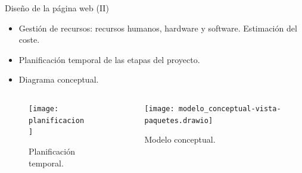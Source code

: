\begin{frame}{Diseño de la página web (II)}

    \begin{itemize}
        \item Gestión de recursos: recursos humanos, hardware y software. Estimación del coste.
        \item Planificación temporal de las etapas del proyecto.
        \item Diagrama conceptual.
    \end{itemize}

   \begin{columns}
        \begin{column}{0.5\textwidth}  
            \begin{figure}[!h]
                \begin{center}
                \caption{Planificación temporal.}
                \label{fig: planificacion}
                \texttt{[image: planificacion]}
                \end{center}
                \end{figure}
        \end{column}
    
        \begin{column}{0.5\textwidth}  
            \begin{figure}[!h]
                \begin{center}
                \caption{Modelo conceptual.}
                \label{diag: modelo_concep}
                \texttt{[image: modelo\_conceptual-vista-paquetes.drawio]}
                \end{center}
                \end{figure}
        \end{column}
\end{columns} 

\end{frame}


